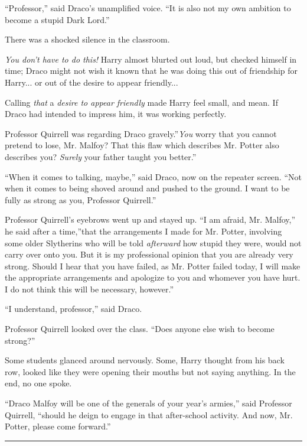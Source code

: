``Professor,'' said Draco's unamplified voice. ``It is also not my own
ambition to become a stupid Dark Lord.''

There was a shocked silence in the classroom.

\emph{You don't have to do this!} Harry almost blurted out loud, but
checked himself in time; Draco might not wish it known that he was doing
this out of friendship for Harry... or out of the desire to appear
friendly...

Calling \emph{that} a \emph{desire to appear friendly} made Harry feel
small, and mean. If Draco had intended to impress him, it was working
perfectly.

Professor Quirrell was regarding Draco gravely.''\emph{You} worry that
you cannot pretend to lose, Mr. Malfoy? That this flaw which describes
Mr. Potter also describes you? \emph{Surely} your father taught you
better.''

``When it comes to talking, maybe,'' said Draco, now on the repeater
screen. ``Not when it comes to being shoved around and pushed to the
ground. I want to be fully as strong as you, Professor Quirrell.''

Professor Quirrell's eyebrows went up and stayed up. ``I am afraid, Mr.
Malfoy,'' he said after a time,''that the arrangements I made for Mr.
Potter, involving some older Slytherins who will be told
\emph{afterward} how stupid they were, would not carry over onto you.
But it is my professional opinion that you are already very strong.
Should I hear that you have failed, as Mr. Potter failed today, I will
make the appropriate arrangements and apologize to you and whomever you
have hurt. I do not think this will be necessary, however.''

``I understand, professor,'' said Draco.

Professor Quirrell looked over the class. ``Does anyone else wish to
become strong?''

Some students glanced around nervously. Some, Harry thought from his
back row, looked like they were opening their mouths but not saying
anything. In the end, no one spoke.

``Draco Malfoy will be one of the generals of your year's armies,'' said
Professor Quirrell, ``should he deign to engage in that after-school
activity. And now, Mr. Potter, please come forward.''

\begin{center}\rule{3in}{0.4pt}\end{center}

